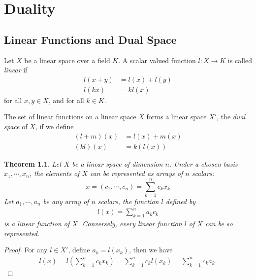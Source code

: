 \documentclass[11pt]{book}
\newtheorem{theorem}{Theorem}[section]
\theoremstyle{definition}
\numberwithin{equation}{chapter}
\begin{document}
\medskip





\chapter{Duality}\label{chapter_Duality}
\section{Linear Functions and Dual Space}

Let $X$ be a linear space over a field $K$. A scalar valued function $l:X\to K$ is called \emph{linear} if 
\begin{align*}
    l(x+y) &= l(x) + l(y) \\
    l(kx) &= k l(x)
\end{align*}
for all $x,y\in X$, and for all $k\in K$.

The set of linear functions on a linear space $X$ forms a linear space $X'$, the \emph{dual space} of $X$, if we define 
\begin{align*}
    (l+m)(x) &= l(x) + m(x) \\
    (kl)(x) &= k(l(x))
\end{align*}

\medskip

\begin{theorem}\label{theorem_dual}
Let $X$ be a linear space of dimension $n$. Under a chosen basis $x_1,\cdots,x_n$, the elements of $X$ can be represented as arrays of $n$ scalars:
$$x = (c_1,\cdots,c_n) = \sum^n_{k=1}c_k x_k$$
Let $a_1,\cdots,a_n$ be any array of $n$ scalars, the function $l$ defined by
\begin{align*}
    l(x) = \sum^n_{k=1} a_k c_k
\end{align*}
is a linear function of $X$. Conversely, every linear function $l$ of $X$ can be so represented.
\end{theorem}
\begin{proof}
For any $l\in X'$, define $a_k = l(x_k)$, then we have 
\begin{align*}
    l(x) = l\left(\sum^n_{k=1}c_k x_k \right) = \sum^n_{k=1}c_k l(x_k) = \sum^n_{k=1}c_k a_k.
\end{align*}
\end{proof}

\medskip
\end{document}
